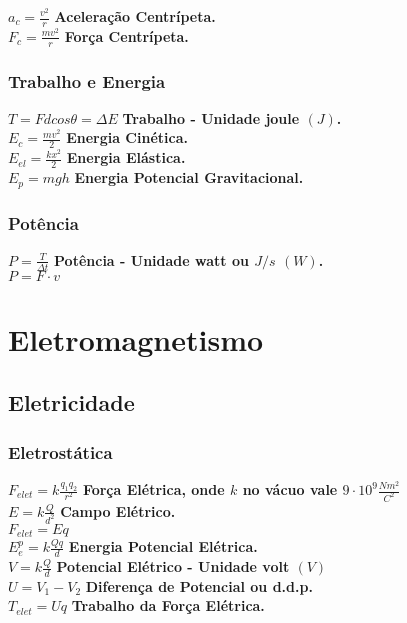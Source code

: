 \documentclass[
    12pt, %
    openright,
    twoside, %
    a4paper, %
    article,
    english,brazil %
]{abntex2}
\begin{document}
$a_c = \frac{v^2}{r}$ \quad \textbf{Aceleração Centrípeta.} \\
$F_c = \frac{mv^2}{r}$ \quad \textbf{Força Centrípeta.}

\subsection{Trabalho e Energia}

$T = Fdcos\theta = \Delta E$ \quad \textbf{Trabalho - Unidade joule $(J)$.} \\
$E_c = \frac{mv^2}{2}$ \quad \textbf{Energia Cinética.} \\
$E_{el} = \frac{kx^2}{2}$ \quad \textbf{Energia Elástica.} \\
$E_{p} = mgh$ \quad \textbf{Energia Potencial Gravitacional.}

\subsection{Potência}

$P = \frac{T}{\Delta t}$ \quad \textbf{Potência - Unidade watt ou $J/s$ $(W)$.} \\
$P = F \cdot v$

\chapter{Eletromagnetismo}

\section{Eletricidade}

\subsection{Eletrostática}

$F_{elet} = k\frac{q_1q_2}{r^2}$ \textbf{Força Elétrica, onde $k$ no vácuo vale $9 \cdot 10^9 \frac{Nm^2}{C^2}$} \\
$E = k\frac{Q}{d^2}$  \quad \textbf{Campo Elétrico.} \\
$F_{elet} = Eq$ \\
$E^{p}_{e} = k\frac{Qq}{d}$ \quad \textbf{Energia Potencial Elétrica.} \\
$V = k\frac{Q}{d}$ \quad \textbf{Potencial Elétrico - Unidade volt $(V)$} \\
$U = V_1 - V_2$ \quad \textbf{Diferença de Potencial ou d.d.p.} \\
$T_{elet} = Uq$ \quad \textbf{Trabalho da Força Elétrica.}
\end{document}
